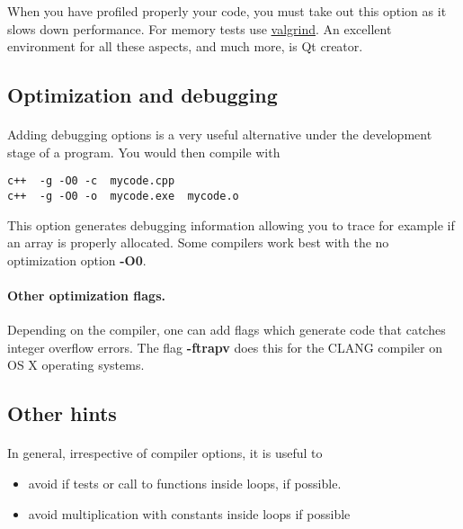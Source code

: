 \documentclass[%
oneside,                 %
final,                   %
10pt]{article}
\begin{document}
When you have profiled properly your code, you must take out this option as it 
slows down performance.
For memory tests use \href{{http://www.valgrind.org}}{valgrind}. An excellent environment for all these aspects, and much  more, is  Qt creator.



\subsection*{Optimization and debugging}

\paragraph{}
Adding debugging options is a very useful alternative under the development stage of a program.
You would then compile with 



\begin{verbatim}
c++  -g -O0 -c  mycode.cpp
c++  -g -O0 -o  mycode.exe  mycode.o

\end{verbatim}

This option generates debugging information allowing you to trace for example if an array is properly allocated. Some compilers work best with the no optimization option \textbf{-O0}.



\paragraph{Other optimization flags.}
Depending on the compiler, one can add flags which generate code that catches integer overflow errors. 
The flag \textbf{-ftrapv} does this for the CLANG compiler on OS X operating systems.



\subsection*{Other hints}

\paragraph{}
In general, irrespective of compiler options, it is useful to
\begin{itemize}
\item avoid if tests or call to functions inside loops, if possible. 

\item avoid multiplication with constants inside loops if possible
\end{itemize}
\end{document}

